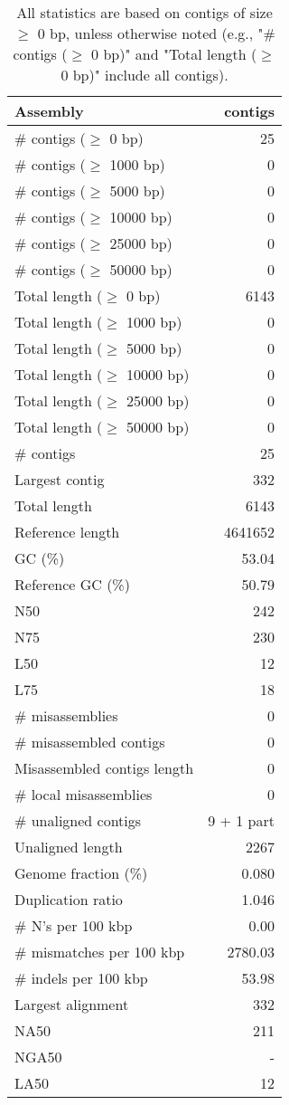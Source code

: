 \documentclass[12pt,a4paper]{article}
\begin{document}
\begin{table}[ht]
\begin{center}
\caption{All statistics are based on contigs of size $\geq$ 0 bp, unless otherwise noted (e.g., "\# contigs ($\geq$ 0 bp)" and "Total length ($\geq$ 0 bp)" include all contigs).}
\begin{tabular}{|l*{1}{|r}|}
\hline
Assembly & contigs \\ \hline
\# contigs ($\geq$ 0 bp) & 25 \\ \hline
\# contigs ($\geq$ 1000 bp) & 0 \\ \hline
\# contigs ($\geq$ 5000 bp) & 0 \\ \hline
\# contigs ($\geq$ 10000 bp) & 0 \\ \hline
\# contigs ($\geq$ 25000 bp) & 0 \\ \hline
\# contigs ($\geq$ 50000 bp) & 0 \\ \hline
Total length ($\geq$ 0 bp) & 6143 \\ \hline
Total length ($\geq$ 1000 bp) & 0 \\ \hline
Total length ($\geq$ 5000 bp) & 0 \\ \hline
Total length ($\geq$ 10000 bp) & 0 \\ \hline
Total length ($\geq$ 25000 bp) & 0 \\ \hline
Total length ($\geq$ 50000 bp) & 0 \\ \hline
\# contigs & 25 \\ \hline
Largest contig & 332 \\ \hline
Total length & 6143 \\ \hline
Reference length & 4641652 \\ \hline
GC (\%) & 53.04 \\ \hline
Reference GC (\%) & 50.79 \\ \hline
N50 & 242 \\ \hline
N75 & 230 \\ \hline
L50 & 12 \\ \hline
L75 & 18 \\ \hline
\# misassemblies & 0 \\ \hline
\# misassembled contigs & 0 \\ \hline
Misassembled contigs length & 0 \\ \hline
\# local misassemblies & 0 \\ \hline
\# unaligned contigs & 9 + 1 part \\ \hline
Unaligned length & 2267 \\ \hline
Genome fraction (\%) & 0.080 \\ \hline
Duplication ratio & 1.046 \\ \hline
\# N's per 100 kbp & 0.00 \\ \hline
\# mismatches per 100 kbp & 2780.03 \\ \hline
\# indels per 100 kbp & 53.98 \\ \hline
Largest alignment & 332 \\ \hline
NA50 & 211 \\ \hline
NGA50 & - \\ \hline
LA50 & 12 \\ \hline
\end{tabular}
\end{center}
\end{table}
\end{document}
